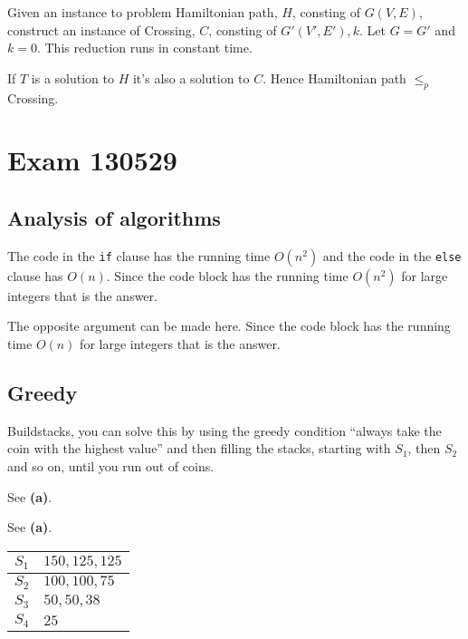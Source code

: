 \documentclass[a4paper]{article}
\newenvironment{task}[1]
{
	\begin{description}[align=right]
		\item [#1]
}{		%
	\end{description}
}
\newcommand{\taskref}[1]{\textbf{#1}}
\DeclareMathOperator{\*}{\cdot}
\begin{document}
\begin{task}{(d)}
	\qquad Given an instance to problem Hamiltonian path, $H$, consting of $G(V,E)$, construct an instance of Crossing, $C$, consting of $G'(V',E'), k$. Let $G=G'$ and $k=0$. This reduction runs in constant time.
	
	If $T$ is a solution to $H$ it's also a solution to $C$. Hence Hamiltonian path $\leq_p$ Crossing.
\end{task}

\pagebreak
\section*{Exam 130529}
\subsection*{Analysis of algorithms}

\begin{task}{1. (a)}
	 The code in the \texttt{if} clause has the running time $O(n^2)$ and the code in the \texttt{else} clause has $O(n)$. Since the code block has the running time $O(n^2)$ for large integers that is the answer.
\end{task}

\begin{task}{2. (a)}
	 The opposite argument can be made here. Since the code block has the running time $O(n)$ for large integers that is the answer.
\end{task}

\subsection*{Greedy}

\begin{task}{3. (a)}
	 Buildstacks, you can solve this by using the greedy condition ``always take the coin with the highest value'' and then filling the stacks, starting with $S_1$, then $S_2$ and so on, until you run out of coins.
\end{task}

\begin{task}{(b)}
	 See \taskref{(a)}.
\end{task}

\begin{task}{(c)}
	 See \taskref{(a)}.
\end{task}

\begin{task}{(d)}
	\begin{tabular}{r l}
		$S_1$ & $150,125,125$ \\ \hline
		$S_2$ & $100,100,75$ \\ \hline
		$S_3$ & $50,50,38$ \\ \hline
		$S_4$ & $25$ \\ 
	\end{tabular}
\end{task}
\end{document}
